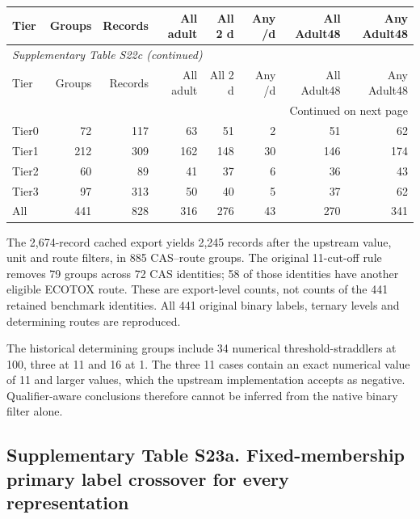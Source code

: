 \begin{longtable}{lrrrrrrr}

\toprule Tier & Groups & Records & All adult & All 2 d & Any /d & All Adult48 & Any Adult48 \\ \midrule\endfirsthead

\multicolumn{8}{l}{\textit{Supplementary Table S22c (continued)}} \\

\toprule Tier & Groups & Records & All adult & All 2 d & Any /d & All Adult48 & Any Adult48 \\ \midrule\endhead

\midrule\multicolumn{8}{r}{Continued on next page}\\\endfoot\bottomrule\endlastfoot

Tier0 & 72 & 117 & 63 & 51 & 2 & 51 & 62 \\

Tier1 & 212 & 309 & 162 & 148 & 30 & 146 & 174 \\

Tier2 & 60 & 89 & 41 & 37 & 6 & 36 & 43 \\

Tier3 & 97 & 313 & 50 & 40 & 5 & 37 & 62 \\

All & 441 & 828 & 316 & 276 & 43 & 270 & 341 \\

\end{longtable}\endgroup

The 2,674-record cached export yields 2,245 records after the upstream value, unit and route filters, in 885 CAS--route groups. The original 11-cut-off rule removes 79 groups across 72 CAS identities; 58 of those identities have another eligible ECOTOX route. These are export-level counts, not counts of the 441 retained benchmark identities. All 441 original binary labels, ternary levels and determining routes are reproduced.

The historical determining groups include 34 numerical threshold-straddlers at 100, three at 11 and 16 at 1. The three 11 cases contain an exact numerical value of 11 and larger values, which the upstream implementation accepts as negative. Qualifier-aware conclusions therefore cannot be inferred from the native binary filter alone.

\subsection*{Supplementary Table S23a. Fixed-membership primary label crossover for every representation}

